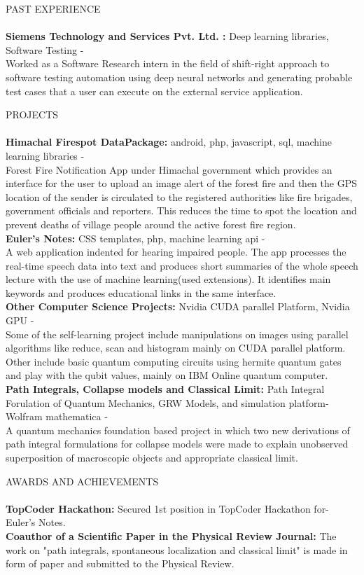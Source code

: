 \documentclass[a4paper]{article}
\newcommand{\lineunder} {
    \vspace*{-8pt} \\
    \hspace*{-18pt} \hrulefill \\
}
\newcommand{\header} [1] {
    {\hspace*{-18pt}\vspace*{6pt} \textsc{#1}}
    \vspace*{-6pt} \lineunder
}
\begin{document}
\header{PAST EXPERIENCE}
\textbf{Siemens Technology and Services Pvt. Ltd.  :} Deep learning libraries, Software Testing -\\
Worked as a Software Research intern in the field of shift-right approach to software testing automation using deep neural networks and generating probable test cases that a user can execute on the external service application. \\
\vspace{2mm}

\header{PROJECTS}
\textbf{Himachal Firespot DataPackage: }android, php, javascript, sql, machine learning libraries -\\
Forest Fire Notification App under Himachal government which provides an interface for the user to
upload an image alert of the forest fire and then the GPS location of the sender is circulated to the
registered authorities like fire brigades, government officials and reporters. This reduces the time to
spot the location and prevent deaths of village people around the active forest fire region. \\
\vspace*{2mm}
\textbf{Euler’s Notes: }CSS templates, php, machine learning api -\\
A web application indented for hearing impaired people. The app processes the real-time speech data
into text and produces short summaries of the whole speech lecture with the use of machine
learning(used extensions). It identifies main keywords and produces educational links in the same
interface. \\
\vspace*{2mm}
\textbf{Other Computer Science Projects: }Nvidia CUDA parallel Platform, Nvidia GPU -\\
Some of the self-learning project include manipulations on images using parallel algorithms like reduce,
scan and histogram mainly on CUDA parallel platform. Other include basic quantum computing
circuits using hermite quantum gates and play with the qubit values, mainly on IBM Online quantum
computer. \\
\vspace*{2mm}
\textbf{Path Integrals, Collapse models and Classical Limit: } Path Integral Forulation of Quantum
Mechanics, GRW Models, and simulation platform-Wolfram mathematica -\\
A quantum mechanics foundation based project in which two new derivations of path integral
formulations for collapse models were made to explain unobserved superposition of macroscopic objects
and appropriate classical limit.\\
\vspace{2mm}

\header{AWARDS AND ACHIEVEMENTS}
\textbf{TopCoder Hackathon: }Secured 1st position in TopCoder Hackathon for-Euler’s Notes.\\
\vspace*{2mm}
\textbf{Coauthor of a Scientific Paper in the Physical Review Journal: } The work on "path integrals, spontaneous localization and classical limit" is made in form of paper and
submitted to the Physical Review.\\
\vspace*{2mm}
\vspace{2mm}
\end{document}
